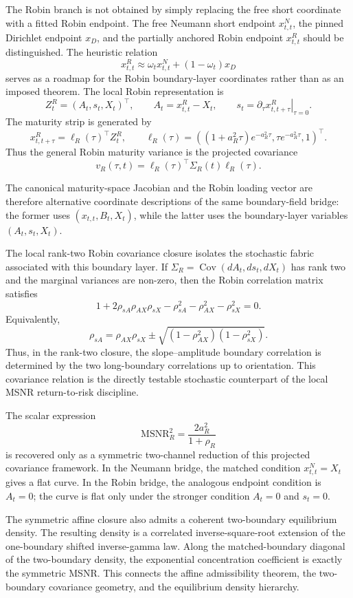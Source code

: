 \documentclass[11pt]{article}
\numberwithin{equation}{section}
\begin{document}
The Robin branch is not obtained by simply replacing the free short coordinate with a fitted Robin endpoint. The free Neumann short endpoint \(x^N_{t,t}\), the pinned Dirichlet endpoint \(x_D\), and the partially anchored Robin endpoint \(x^R_{t,t}\) should be distinguished. The heuristic relation
\[
x^R_{t,t}\approx \omega_t x^N_{t,t}+(1-\omega_t)x_D
\]
serves as a roadmap for the Robin boundary-layer coordinates rather than as an imposed theorem. The local Robin representation is
\[
Z^R_t=(A_t,s_t,X_t)^\top,
\qquad
A_t=x^R_{t,t}-X_t,
\qquad
s_t=\left.\partial_\tau x^R_{t,t+\tau}\right|_{\tau=0}.
\]
The maturity strip is generated by
\[
x^R_{t,t+\tau}=\ell_R(\tau)^\top Z^R_t,
\qquad
\ell_R(\tau)=
\left(
(1+a_R^2\tau)e^{-a_R^2\tau},
\tau e^{-a_R^2\tau},
1
\right)^\top.
\]
Thus the general Robin maturity variance is the projected covariance
\[
v_R(\tau,t)=\ell_R(\tau)^\top\Sigma_R(t)\ell_R(\tau).
\]

The canonical maturity-space Jacobian and the Robin loading vector are therefore alternative coordinate descriptions of the same boundary-field bridge: the former uses \((x_{t,t},B_t,X_t)\), while the latter uses the boundary-layer variables \((A_t,s_t,X_t)\).

The local rank-two Robin covariance closure isolates the stochastic fabric associated with this boundary layer.  If \(\Sigma_R=\operatorname{Cov}(dA_t,ds_t,dX_t)\) has rank two and the marginal variances are non-zero, then the Robin correlation matrix satisfies
\[
        1+2\rho_{sA}\rho_{AX}\rho_{sX}
        -\rho_{sA}^2-\rho_{AX}^2-\rho_{sX}^2=0.
\]
Equivalently,
\[
        \rho_{sA}
        =
        \rho_{AX}\rho_{sX}
        \pm
        \sqrt{(1-\rho_{AX}^2)(1-\rho_{sX}^2)}.
\]
Thus, in the rank-two closure, the slope--amplitude boundary correlation is determined by the two long-boundary correlations up to orientation.  This covariance relation is the directly testable stochastic counterpart of the local MSNR return-to-risk discipline.

The scalar expression
\[
\mathrm{MSNR}_{R}^2=\frac{2a_R^2}{1+\rho_R}
\]
is recovered only as a symmetric two-channel reduction of this projected covariance framework. In the Neumann bridge, the matched condition \(x^N_{t,t}=X_t\) gives a flat curve. In the Robin bridge, the analogous endpoint condition is \(A_t=0\); the curve is flat only under the stronger condition \(A_t=0\) and \(s_t=0\).

The symmetric affine closure also admits a coherent two-boundary equilibrium density. The resulting density is a correlated inverse-square-root extension of the one-boundary shifted inverse-gamma law. Along the matched-boundary diagonal of the two-boundary density, the exponential concentration coefficient is exactly the symmetric MSNR. This connects the affine admissibility theorem, the two-boundary covariance geometry, and the equilibrium density hierarchy.
\end{document}
